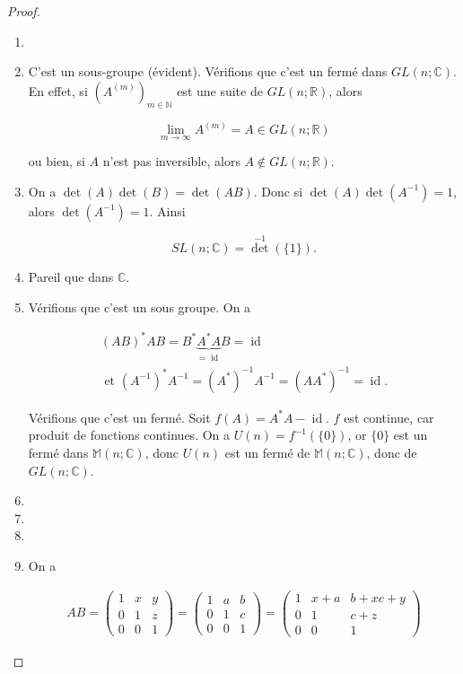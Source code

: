 \documentclass[french]{book}
\theoremstyle{definition}
\begin{document}
\begin{proof}

  \

  \begin{enumerate}
    \item
    \item C'est un sous-groupe (évident). Vérifions que c'est un fermé dans \(GL(n;\mathbb{C})\). En effet, si \((A ^{(m)})_{m \in \mathbb{N}}\) est une suite de \(GL(n;\mathbb{R})\), alors

    \[\lim_{m \to \infty} A ^{(m)} = A \in GL(n;\mathbb{R})\]

    ou bien, si \(A\) n'est pas inversible, alors \(A \notin GL(n;\mathbb{R})\).

    \item On a \(\operatorname{det}(A) \operatorname{det}(B) = \operatorname{det}(AB)\). Donc si \(\operatorname{det}(A)\operatorname{det}(A ^{-1})=1\), alors \(\operatorname{det}(A ^{-1})=1\). Ainsi

    \[SL(n;\mathbb{C}) = \operatorname{det}^{-1}(\{ 1 \}).\]
    \item Pareil que dans \(\mathbb{C}\).
    \item Vérifions que c'est un sous groupe. On a

    \begin{gather*}
      (A B)^{*}A B = B ^{*} \underbrace{A ^{*} A}_{= \operatorname{id}} B = \operatorname{id} \\
      \text{ et } (A ^{-1})^{*}A ^{-1} = (A ^{*})^{-1}A ^{-1} = (A A ^{*})^{-1} = \operatorname{id}.
    \end{gather*}

    Vérifions que c'est un fermé. Soit \(f(A) = A ^{*} A - \operatorname{id}\). \(f\) est continue, car produit de fonctions continues. On a \(U(n) = f ^{-1}(\{ 0 \})\), or \(\{ 0 \}\) est un fermé dans \(\mathbb{M}(n;\mathbb{C})\), donc \(U(n)\) est un fermé de \(\mathbb{M}(n;\mathbb{C})\), donc de \(GL(n;\mathbb{C})\).
    \item
    \item
    \item
    \item On a

    \begin{gather*}
      AB = \begin{pmatrix}
        1 & x & y \\
        0 & 1 & z \\
        0 & 0 & 1
      \end{pmatrix} = \begin{pmatrix}
        1 & a & b \\
        0 & 1 & c \\
        0 & 0 & 1
      \end{pmatrix} = \begin{pmatrix}
        1 & x+a & b+xc+y \\
        0 & 1 & c+z \\
        0 & 0 & 1
      \end{pmatrix}
    \end{gather*}


\end{enumerate}
\end{proof}
\end{document}
